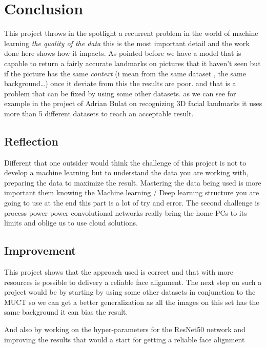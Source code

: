 \documentclass[11pt]{article}
\begin{document}
\section{Conclusion}
\label{sec:org1246403}

This project throws in the spotlight a recurrent problem in the world of
machine learning \emph{the quality of the data} this is the most important detail
and the work done here shows how it impacts.
As pointed before we have a model that is capable to return a fairly accurate
landmarks on pictures that it haven't seen but if the picture has the same
\emph{context} (i mean from the same dataset , the same background\ldots{}) once it
deviate from this the results are poor. and that is a problem that can be
fixed by using some other datasets. as we can see for example in the project
of  Adrian Bulat on recognizing 3D facial landmarks \cite{bulat2017far} it uses
more than 5 different datasets to reach an acceptable result.

\subsection{Reflection}
\label{sec:orgb7ee482}

Different that one outsider would think the challenge of this project is not
to develop a machine learning but to understand the data you are working
with, preparing the data to maximize the result.
Mastering the data being used is more important them knowing the Machine
learning / Deep learning structure you are going to use at the end this part
is a lot of try and error. 
The second challenge is process power power convolutional networks really
bring the home PCs to its limits and oblige us to use cloud solutions. 


\subsection{Improvement}
\label{sec:org27b001a}
This project shows that the approach used is correct and that with more
resources is possible to delivery a reliable face alignment. 
The next step on such a project would be by starting by using some other
datasets in conjunction to the MUCT so we can get a better generalization as
all the images on this set has the same background it can bias the result. 

And also by working on the hyper-parameters for the ResNet50 network and
improving the results that would a start for getting a reliable face alignment 
\end{document}
